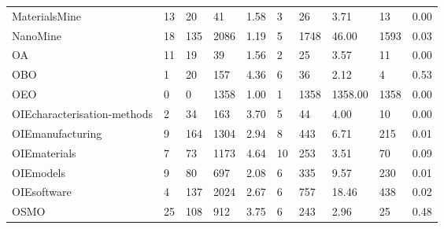 \begin{tabular}{llllllllll}
MaterialsMine               &                         13 &                         20 &              41 &           1.58 &              3 &                26 &             3.71 &               13 &         0.00 \\
NanoMine                    &                         18 &                        135 &            2086 &           1.19 &              5 &              1748 &            46.00 &             1593 &         0.03 \\
OA                          &                         11 &                         19 &              39 &           1.56 &              2 &                25 &             3.57 &               11 &         0.00 \\
OBO                         &                          1 &                         20 &             157 &           4.36 &              6 &                36 &             2.12 &                4 &         0.53 \\
OEO                         &                          0 &                          0 &            1358 &           1.00 &              1 &              1358 &          1358.00 &             1358 &         0.00 \\
OIEcharacterisation-methods &                          2 &                         34 &             163 &           3.70 &              5 &                44 &             4.00 &               10 &         0.00 \\
OIEmanufacturing            &                          9 &                        164 &            1304 &           2.94 &              8 &               443 &             6.71 &              215 &         0.01 \\
OIEmaterials                &                          7 &                         73 &            1173 &           4.64 &             10 &               253 &             3.51 &               70 &         0.09 \\
OIEmodels                   &                          9 &                         80 &             697 &           2.08 &              6 &               335 &             9.57 &              230 &         0.01 \\
OIEsoftware                 &                          4 &                        137 &            2024 &           2.67 &              6 &               757 &            18.46 &              438 &         0.02 \\
OSMO                        &                         25 &                        108 &             912 &           3.75 &              6 &               243 &             2.96 &               25 &         0.48 \\

\end{tabular}
